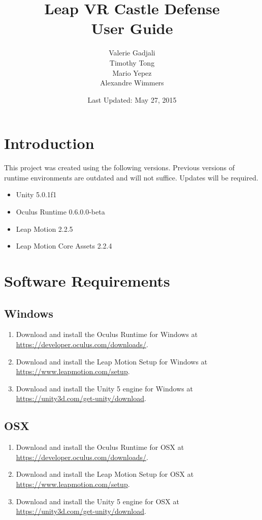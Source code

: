 \documentclass[a4paper]{refart}
\title{Leap VR Castle Defense\\User Guide}
\author{Valerie Gadjali\\
	Timothy Tong\\
	Mario Yepez\\
	Alexandre Wimmers
}
\date{Last Updated: May 27, 2015}
\begin{document}
\maketitle

\tableofcontents

\newpage

\section{Introduction}

This project was created using the following versions. Previous versions of runtime environments are outdated and will not suffice. Updates will be required.

\begin{itemize}
	\item Unity 5.0.1f1
	\item Oculus Runtime 0.6.0.0-beta
	\item Leap Motion 2.2.5
	\item Leap Motion Core Assets 2.2.4
\end{itemize}

\section{Software Requirements}

\subsection{Windows}

\begin{enumerate}
	\item Download and install the Oculus Runtime for Windows at\\ \url{https://developer.oculus.com/downloads/}.
	\item Download and install the Leap Motion Setup for Windows at\\ \url{https://www.leapmotion.com/setup}.
	\item Download and install the Unity 5 engine for Windows at\\ \url{https://unity3d.com/get-unity/download}.
\end{enumerate}

\subsection{OSX}

\begin{enumerate}
	\item Download and install the Oculus Runtime for OSX at\\ \url{https://developer.oculus.com/downloads/}.
	\item Download and install the Leap Motion Setup for OSX at\\ \url{https://www.leapmotion.com/setup}.
	\item Download and install the Unity 5 engine for OSX at\\ \url{https://unity3d.com/get-unity/download}.
\end{enumerate}
\end{document}
